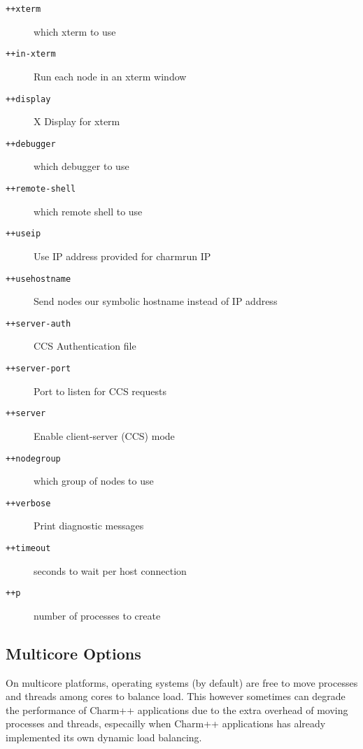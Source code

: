 \begin{description}
\item[{\tt ++xterm}]            which xterm to use

\item[{\tt ++in-xterm}]         Run each node in an xterm window

\item[{\tt ++display}]          X Display for xterm

\item[{\tt ++debugger}]         which debugger to use

\item[{\tt ++remote-shell}]     which remote shell to use

\item[{\tt ++useip}]            Use IP address provided for charmrun IP

\item[{\tt ++usehostname}]      Send nodes our symbolic hostname instead of IP address



\item[{\tt ++server-auth}]      CCS Authentication file

\item[{\tt ++server-port}]      Port to listen for CCS requests

\item[{\tt ++server}]           Enable client-server (CCS) mode

\item[{\tt ++nodegroup}]        which group of nodes to use

\item[{\tt ++verbose}]          Print diagnostic messages

\item[{\tt ++timeout}]          seconds to wait per host connection

\item[{\tt ++p}]                number of processes to create

\end{description}

\subsection{Multicore Options}

On multicore platforms, operating systems (by default) are free to move
processes and threads among cores to balance load. This however sometimes can
degrade the performance of Charm++ applications due to the extra overhead of
moving processes and threads, especailly when Charm++ applications has already
implemented its own dynamic load balancing.

